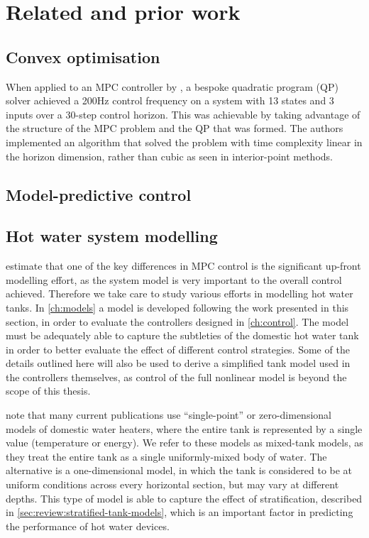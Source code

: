 \chapter{Related and prior work}
\label{ch:review}

\section{Convex optimisation}


When applied to an MPC controller by \textcite{Wang10}, a bespoke quadratic program (QP) solver achieved a 200Hz control frequency on a system with 13 states and 3 inputs over a 30-step control horizon.
This was achievable by taking advantage of the structure of the MPC problem and the QP that was formed.
The authors implemented an algorithm that solved the problem with time complexity linear in the horizon dimension, rather than cubic as seen in interior-point methods.

\section{Model-predictive control}


\section{Hot water system modelling}

 estimate that one of the key differences in MPC control is the significant up-front modelling effort, as the system model is very important to the overall control achieved.
Therefore we take care to study various efforts in modelling hot water tanks.
In \autoref{ch:models} a model is developed following the work presented in this section, in order to evaluate the controllers designed in \autoref{ch:control}.
The model must be adequately able to capture the subtleties of the domestic hot water tank in order to better evaluate the effect of different control strategies.
Some of the details outlined here will also be used to derive a simplified tank model used in the controllers themselves, as control of the full nonlinear model is beyond the scope of this thesis.

\textcite{Vrettos12} note that many current publications use ``single-point'' or zero-dimensional models of domestic water heaters, where the entire tank is represented by a single value (temperature or energy).
We refer to these models as mixed-tank models, as they treat the entire tank as a single uniformly-mixed body of water.
The alternative is a one-dimensional model, in which the tank is considered to be at uniform conditions across every horizontal section, but may vary at different depths.
This type of model is able to capture the effect of stratification, described in \autoref{sec:review:stratified-tank-models}, which is an important factor in predicting the performance of hot water devices.

